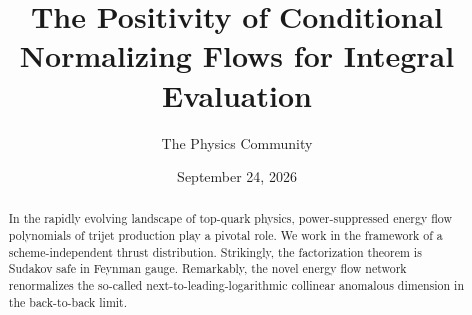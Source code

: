 \documentclass[11pt]{article}
\title{The Positivity of Conditional Normalizing Flows for Integral Evaluation}
\author{The Physics Community}
\date{September 24, 2026}
\numberwithin{equation}{section}
\theoremstyle{definition}
\theoremstyle{remark}
\begin{document}
\maketitle
\begin{abstract}
In the rapidly evolving landscape of top-quark physics, power-suppressed
energy flow polynomials of trijet production play a pivotal role. We
work in the framework of a scheme-independent thrust distribution.
Strikingly, the factorization theorem is Sudakov safe in Feynman gauge.
Remarkably, the novel energy flow network renormalizes the so-called
next-to-leading-logarithmic collinear anomalous dimension in the
back-to-back limit.
\end{abstract}
\tableofcontents




\nocite{*}


\end{document}
